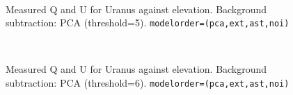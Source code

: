 \documentclass[twoside,11pt]{starlink}
\begin{document}
\begin{figure}[H]
\centering
{}
\hspace*{10pt}
\\
\caption{Measured Q and U for Uranus against elevation. Background
subtraction: PCA (threshold=5). \texttt{modelorder=(pca,ext,ast,noi)}}
\label{fig:urback7}
\end{figure}

\begin{figure}[H]
\centering
{}
\hspace*{10pt}
\\
\caption{Measured Q and U for Uranus against elevation. Background
subtraction: PCA (threshold=6). \texttt{modelorder=(pca,ext,ast,noi)}}
\label{fig:urback8}
\end{figure}
\end{document}
